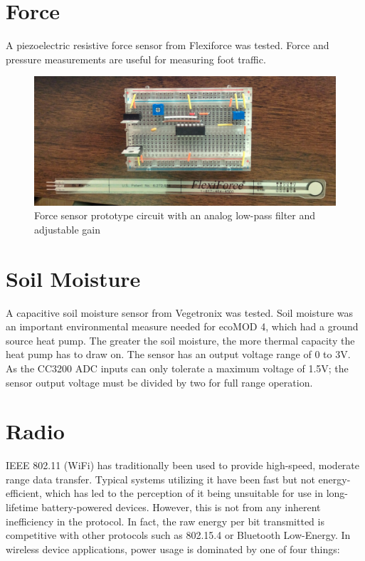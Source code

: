 \section{Force}
    
A piezoelectric resistive force sensor from Flexiforce was tested. Force and pressure measurements are useful for measuring foot traffic. 


\begin{figure}[h]
\centering
\includegraphics[width=0.33\linewidth]{images/force-proto}
\caption[Force sensor prototype]{Force sensor prototype circuit with an analog low-pass filter and adjustable gain}
\label{fig:force-proto}
\end{figure}

\section{Soil Moisture}

A capacitive soil moisture sensor from Vegetronix was tested. Soil moisture was an important environmental measure needed for ecoMOD 4, which had a ground source heat pump. The greater the soil moisture, the more thermal capacity the heat pump has to draw on. The sensor has an output voltage range of 0 to 3V. As the CC3200 ADC inputs can only tolerate a maximum voltage of 1.5V; the sensor output voltage must be divided by two for full range operation.



\section{Radio}

IEEE 802.11 (WiFi) has traditionally been used to provide high-speed, moderate range data transfer. Typical systems utilizing it have been fast but not energy-efficient, which has led to the perception of it being unsuitable for use in long-lifetime battery-powered devices. However, this is not from any inherent inefficiency in the protocol. In fact, the raw energy per bit transmitted is competitive with other protocols such as 802.15.4 or Bluetooth Low-Energy\cite{DanielDobkin2009}. In wireless device applications, power usage is dominated by one of four things:

